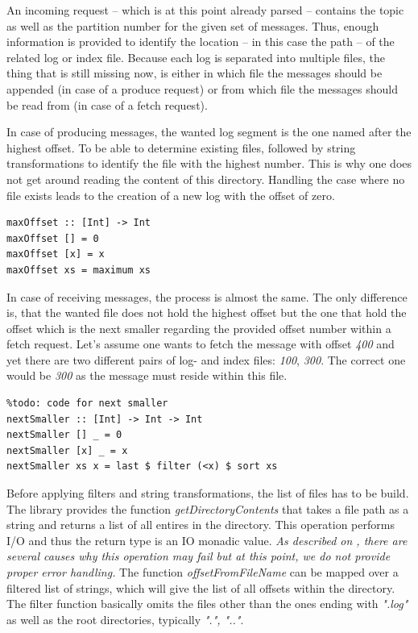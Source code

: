 An incoming request -- which is at this point already parsed -- contains the
topic as well as the partition number for the given set of messages. Thus,
enough information is provided to identify the location -- in this case the path
-- of the related log or index file. Because each log is separated into multiple
files, the thing that is still missing now, is either in
which file the messages should be appended (in case of a produce request) or
from which file the messages should be read from (in case of a fetch request).

In case of producing messages, the wanted log segment is the one named after the
highest offset. To be able to determine existing files, followed by string
transformations to identify the file with the highest number. This is why one
does not get around reading the content of this directory. Handling the case
where no file exists leads to the creation of a new log with the offset of zero.

\begin{lstlisting}
maxOffset :: [Int] -> Int
maxOffset [] = 0
maxOffset [x] = x
maxOffset xs = maximum xs
\end{lstlisting}

In case of receiving messages, the process is almost the same. The only
difference is, that the wanted file does not hold the highest offset but the one
that hold the offset which is the next smaller regarding the provided offset
number within a fetch request. Let's assume one wants to fetch the message with
offset \textit{400} and yet there are two different pairs of log- and index
files: \textit{100}, \textit{300}. The correct one would be \textit{300} as the
message must reside within this file.

\begin{lstlisting}
%todo: code for next smaller
nextSmaller :: [Int] -> Int -> Int
nextSmaller [] _ = 0
nextSmaller [x] _ = x
nextSmaller xs x = last $ filter (<x) $ sort xs
\end{lstlisting}

Before applying filters and string transformations, the list of files has to be
build. The library
provides the function \textit{getDirectoryContents} that takes a file path as a
string and returns a list of all entires in the directory. This operation
performs I/O and thus the return type is an IO monadic value. \textit{As
described on
,
there are several causes why this operation may fail but at this point, we do
not provide proper error handling.}
The function \textit{offsetFromFileName} can be mapped over a filtered list of
strings, which will give the list of all offsets within the directory. The
filter function basically omits the files other than the ones ending with
\textit{".log"} as well as the root directories, typically \textit{".", ".."}.

